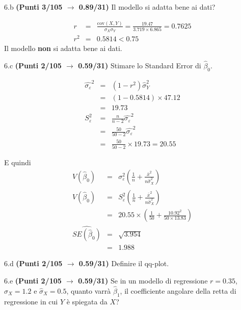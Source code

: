 \documentclass[
  11pt,
]{book}
\theoremstyle{mytheoremstyle}
\theoremstyle{mydefstyle}
\newenvironment{sol}
  {
  \begin{tcolorbox}[enhanced,breakable,arc=0.1mm,boxrule=1pt,colback=white,colframe=iblue,
  title=\bf \fontfamily{lmss}\selectfont \hspace{.5 cm} Soluzione,drop fuzzy shadow]

}{
\end{tcolorbox}
  }
\begin{document}
6.b \textbf{(Punti 3/105 \(\rightarrow\) 0.89/31)} Il modello si adatta bene ai dati?

\begin{sol}
\begin{eqnarray*}
r&=&\frac{\text{cov}(X,Y)}{\sigma_X\sigma_Y}=\frac{ 19.47 }{ 3.719 \times 6.865 }= 0.7625 \\r^2&=& 0.5814 < 0.75
\end{eqnarray*}
Il modello \textbf{non} si adatta bene ai dati.

\end{sol}

6.c \textbf{(Punti 2/105 \(\rightarrow\) 0.59/31)} Stimare lo Standard Error di \(\hat\beta_0\).

\begin{sol}
\begin{eqnarray*}
\hat{\sigma_\varepsilon}^2&=&(1-r^2)\hat\sigma_Y^2\\
&=& (1- 0.5814 )\times 47.12 \\
   &=&  19.73 \\
   S_\varepsilon^2 &=& \frac{n} {n-2} \hat{\sigma_\varepsilon}^2\\
   &=&  \frac{ 50 } { 50 -2} \hat{\sigma_\varepsilon}^2 \\
 &=&  \frac{ 50 } { 50 -2} \times  19.73  =  20.55  
\end{eqnarray*}

E quindi\begin{eqnarray*}
V(\hat\beta_{0}) &=& \sigma_{\varepsilon}^{2} \left( \frac{1} {n}  +  \frac{\bar{x}^{2}} {n \hat{\sigma}^{2}_{X}} \right)\\
\widehat{V(\hat\beta_{0})} &=& S_{\varepsilon}^{2}\left( \frac{1} {n}  +  \frac{\bar{x}^{2}} {n \hat{\sigma}^{2}_{X}} \right)\ \\
 &=&  20.55 \times\left( \frac{1} { 50 }  +  \frac{ 10.92 ^{2}} { 50 \times  13.83 } \right)\\
 \widehat{SE(\hat\beta_{0})}        &=&  \sqrt{ 3.954 }\\
 &=&  1.988 
\end{eqnarray*}

\end{sol}

6.d \textbf{(Punti 2/105 \(\rightarrow\) 0.59/31)} Definire il qq-plot.

6.e \textbf{(Punti 2/105 \(\rightarrow\) 0.59/31)} Se in un modello di regressione \(r=0.35\), \(\hat\sigma_X=1.2\) e \(\hat\sigma_X=0.5\), quanto varrà
\(\hat\beta_1\), il coefficiente angolare della retta di regressione in cui \(Y\) è spiegata da \(X\)?
\end{document}
